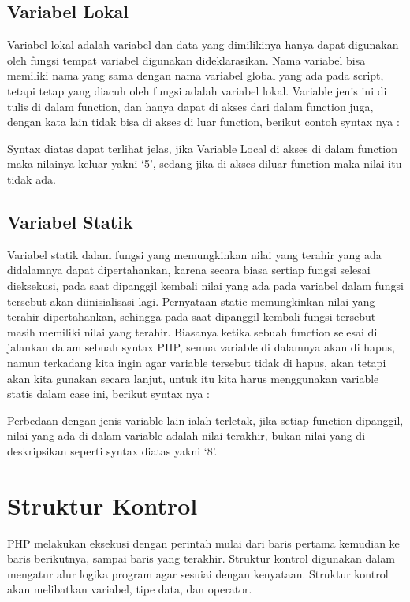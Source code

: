 \subsection{Variabel Lokal}
Variabel lokal adalah variabel dan data yang dimilikinya hanya dapat digunakan oleh fungsi tempat variabel digunakan dideklarasikan.
Nama variabel bisa memiliki nama yang sama dengan nama variabel global yang ada pada script, tetapi tetap yang diacuh oleh fungsi adalah variabel lokal.
Variable jenis ini di tulis di dalam function, dan hanya dapat di akses dari dalam function juga, dengan kata lain tidak bisa di akses di luar function, berikut contoh syntax nya :

Syntax diatas dapat terlihat jelas, jika Variable Local di akses di dalam function maka nilainya keluar yakni ‘5’, sedang jika di akses diluar function maka nilai itu tidak ada.

\subsection{Variabel Statik}
Variabel statik dalam fungsi yang memungkinkan nilai yang terahir yang ada didalamnya dapat dipertahankan, karena secara biasa sertiap fungsi selesai dieksekusi, pada saat dipanggil kembali nilai yang ada pada variabel dalam fungsi tersebut akan diinisialisasi lagi. Pernyataan static memungkinkan nilai yang terahir dipertahankan, sehingga pada saat dipanggil kembali fungsi tersebut masih memiliki nilai yang terahir. Biasanya ketika sebuah function selesai di jalankan dalam sebuah syntax PHP, semua variable di dalamnya akan di hapus, namun terkadang kita ingin agar variable tersebut tidak di hapus, akan tetapi akan kita gunakan secara lanjut, untuk itu kita harus menggunakan variable statis dalam case ini, berikut syntax nya :

Perbedaan dengan jenis variable lain ialah terletak, jika setiap function dipanggil, nilai yang ada di dalam variable adalah nilai terakhir, bukan nilai yang di deskripsikan seperti syntax diatas yakni ‘8’.


\section{Struktur Kontrol}
PHP melakukan eksekusi dengan perintah mulai dari baris pertama kemudian ke baris berikutnya, sampai baris yang terakhir. Struktur kontrol digunakan dalam mengatur alur logika program agar sesuiai dengan kenyataan. Struktur kontrol akan melibatkan variabel, tipe data, dan operator. 
